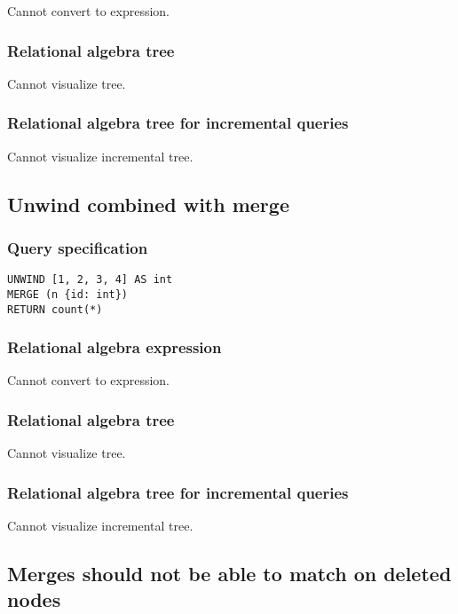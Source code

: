 Cannot convert to expression.

\subsubsection*{Relational algebra tree}

Cannot visualize tree.

\subsubsection*{Relational algebra tree for incremental queries}

Cannot visualize incremental tree.

\subsection{Unwind combined with merge}

\subsubsection*{Query specification}

\begin{lstlisting}
UNWIND [1, 2, 3, 4] AS int
MERGE (n {id: int})
RETURN count(*)
\end{lstlisting}

\subsubsection*{Relational algebra expression}

Cannot convert to expression.

\subsubsection*{Relational algebra tree}

Cannot visualize tree.

\subsubsection*{Relational algebra tree for incremental queries}

Cannot visualize incremental tree.

\subsection{Merges should not be able to match on deleted nodes}

